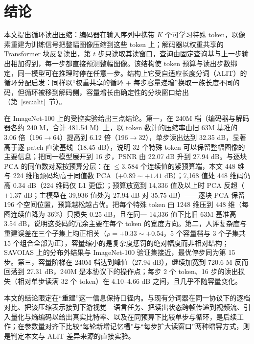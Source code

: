 \section{\heiti 结论}
\label{sec:conclusion}

本文提出循环读出压缩：编码器在输入序列中携带 $K$ 个可学习特殊 token，以像素重建为训练信号把整幅图像压缩到这些 token 上；解码器以权重共享的 Transformer 块反复读出，第 $t$ 步只读取其读窗口，查询由固定查询基与上一步输出相加得到，每一步都直接预测整幅图像。该结构使 token 预算与读出步数绑定，同一模型可在推理时停在任意一步。结构上它受自适应长度分词（ALIT）的循环分配\cite{duggal2025alit}启发：同样以“权重共享的循环 + 每步容量递增”换取一族长度不同的码，但循环被移到解码侧，容量增长由确定性的分块窗口给出（第~\ref{sec:alit}~节）。

在 ImageNet-100 上的受控实验给出三点结论。第一，在 240M 档（编码器与解码器各约 240 M，合计 481.54 M）上，以 token 数计的压缩率由旧 63M 基准的 3.06 倍（196$\to$64）提高到 6.12 倍（196$\to$32），单步读出达到 32.35 dB，显著高于逐 patch 直流基线（18.45 dB），说明 32 个特殊 token 可以保留整幅图像的主要信息；把同一模型展开到 16 步，PSNR 由 22.07 dB 升到 27.94 dB。与逐块 PCA 的同值数对照按预算分层：在 $\le3{,}584$ 个连续值的紧预算端，本文 448 维与 224 维瓶颈码均高于同值数 PCA（$+0.89\sim+1.41$ dB）；7{,}168 值处 448 维码仍高 0.34 dB（224 维码仅 L1 更低）；预算放宽到 14{,}336 值及以上时 PCA 反超（$+1.37$ dB；主模型在 39{,}936 值处为 27.94 dB 对 35.75 dB）——逐块 PCA 保留 196 个空间位置，预算越松越占优。把每个特殊 token 由 1248 维压到 448 维（每图连续值降为 36$\%$）只损失 0.25 dB，且在同一 14{,}336 值下比旧 63M 基准高 3.54 dB，说明这类码的冗余主要在每个 token 的宽度方向。第二，人评复杂度与重建误差在三个子集上均正相关（$\rho=+0.33\sim+0.54$，5 个容量档与 3 个子集共 15 个组合全部为正），容量缩小的是复杂度惩罚的绝对幅度而非相对结构；SAVOIAS 上的分布外结果与 ImageNet-100 验证集接近，最优停步同为第 15 步。第三，容量阶梯在 240M 档达到峰值（27.94 dB），继续加宽到 720.6 M 反而回落到 27.31 dB，240M 是本协议下的操作点；每步 2 个 token、16 步的读出损失（相对单步读满 32 个 token）在 4.10--4.66 dB 之间，且几乎不随容量变化。

本文的结论限定在“重建”这一信息保持口径内。与现有分词器在同一协议下的逐档对比、把该压缩表示接到下游视觉—语言任务、把读出状态跨帧传递到视频流、引入量化与熵编码以给出真实比特率、以及在同预算下比较单步与循环，是后续工作；在参数量对齐下比较“每轮新增记忆槽”与“每步扩大读窗口”两种增容方式，则是判定本文与 ALIT 差异来源的直接实验。

